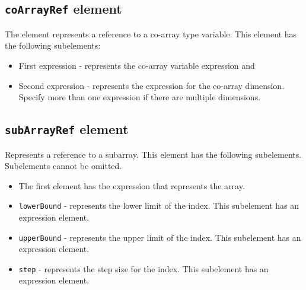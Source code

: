 \subsection{ {\tt coArrayRef} element}

The element represents a reference to a co-array type variable.
This element has the following subelements:

\begin{itemize}
\item First expression - represents the co-array variable expression and
\item Second expression - represents the expression for the co-array dimension. 
Specify more than one expression if there are multiple dimensions. 
\end{itemize}


\subsection{ {\tt subArrayRef} element}

Represents a reference to a subarray. 
This element has the following subelements. Subelements cannot be omitted.

\begin{itemize}
\item The first element has the expression that represents the array.
\item {\tt lowerBound} - represents the lower limit of the index. 
This subelement has an expression element.
\item {\tt upperBound} - represents the upper limit of the index.
This subelement has an expression element.
\item {\tt step} - represents the step size for the index. 
This subelement has an expression element.
\end{itemize}


